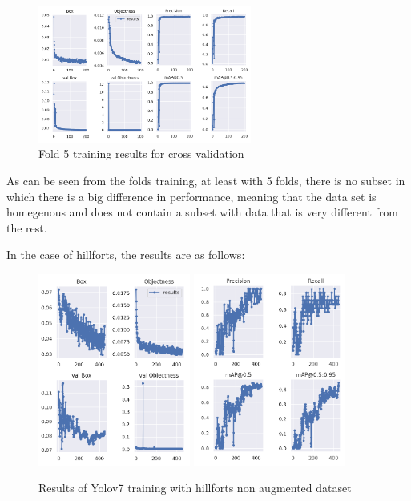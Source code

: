\begin{figure}[H]
\centering
\includegraphics[width=7cm]{images/training/cross/04.png}
\caption{Fold 5 training results for cross validation}
\end{figure}

As can be seen from the folds training, at least with 5 folds, there is no subset in which there is a big difference in performance, meaning that the data set is homegenous and does not contain a subset with data that is very different from the rest.


In the case of hillforts, the results are as follows:

\begin{figure}[H]
    \centering
    {{\includegraphics[width=5cm]{images/training/castros/notaug1.png} }}
    \qquad
    {{\includegraphics[width=5cm]{images/training/castros/notaug2.png} }}
    \caption{Results of Yolov7 training with hillforts non augmented dataset}
    \label{fig:example}
\end{figure}

